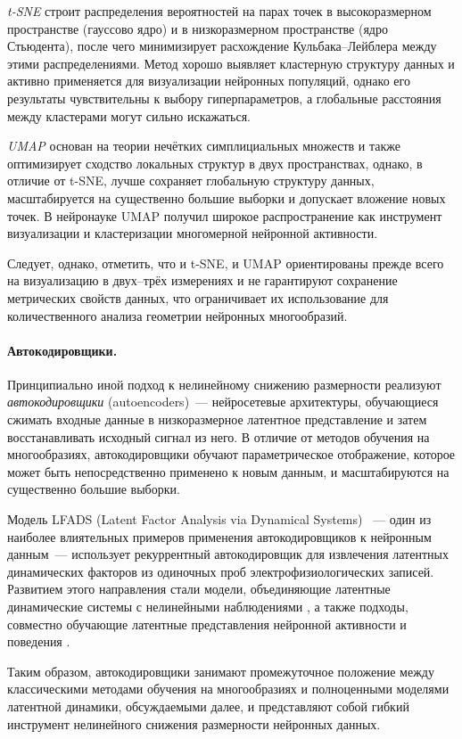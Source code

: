 \textit{t-SNE} \cite{vandermaaten08a} строит распределения вероятностей на парах точек в высокоразмерном пространстве (гауссово ядро) и в низкоразмерном пространстве (ядро Стьюдента), после чего минимизирует расхождение Кульбака--Лейблера между этими распределениями.
Метод хорошо выявляет кластерную структуру данных и активно применяется для визуализации нейронных популяций, однако его результаты чувствительны к выбору гиперпараметров, а глобальные расстояния между кластерами могут сильно искажаться.

\textit{UMAP} \cite{McInnes2018} основан на теории нечётких симплициальных множеств и также оптимизирует сходство локальных структур в двух пространствах, однако, в отличие от t-SNE, лучше сохраняет глобальную структуру данных, масштабируется на существенно большие выборки и допускает вложение новых точек.
В нейронауке UMAP получил широкое распространение как инструмент визуализации и кластеризации многомерной нейронной активности.

Следует, однако, отметить, что и t-SNE, и UMAP ориентированы прежде всего на визуализацию в двух--трёх измерениях и не гарантируют сохранение метрических свойств данных, что ограничивает их использование для количественного анализа геометрии нейронных многообразий.

\paragraph{Автокодировщики.}
Принципиально иной подход к нелинейному снижению размерности реализуют \textit{автокодировщики} (autoencoders)~--- нейросетевые архитектуры, обучающиеся сжимать входные данные в низкоразмерное латентное представление и затем восстанавливать исходный сигнал из него.
В отличие от методов обучения на многообразиях, автокодировщики обучают параметрическое отображение, которое может быть непосредственно применено к новым данным, и масштабируются на существенно большие выборки.

Модель LFADS (Latent Factor Analysis via Dynamical Systems) \cite{Pandarinath2018}~--- один из наиболее влиятельных примеров применения автокодировщиков к нейронным данным~--- использует рекуррентный автокодировщик для извлечения латентных динамических факторов из одиночных проб электрофизиологических записей.
Развитием этого направления стали модели, объединяющие латентные динамические системы с нелинейными наблюдениями \cite{hernandez2020}, а также подходы, совместно обучающие латентные представления нейронной активности и поведения \cite{Schneider2023}.

Таким образом, автокодировщики занимают промежуточное положение между классическими методами обучения на многообразиях и полноценными моделями латентной динамики, обсуждаемыми далее, и представляют собой гибкий инструмент нелинейного снижения размерности нейронных данных.
